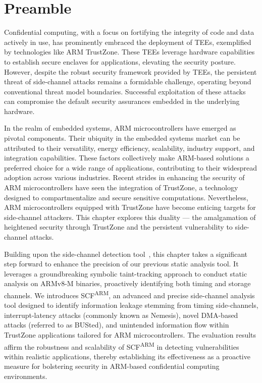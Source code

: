 
\section*{Preamble}

Confidential computing, with a focus on fortifying the integrity of code
and data actively in use, has prominently embraced the deployment of
\acp{TEE}, exemplified by technologies like ARM TrustZone. These
\acp{TEE} leverage hardware capabilities to establish secure enclaves for
applications, elevating the security posture. However, despite the robust
security framework provided by \acp{TEE}, the persistent threat of
side-channel attacks remains a formidable challenge, operating beyond
conventional threat model boundaries. Successful exploitation of these
attacks can compromise the default security assurances embedded in the
underlying hardware.

In the realm of embedded systems, ARM microcontrollers have emerged as
pivotal components. Their ubiquity in the embedded systems market can be
attributed to their versatility, energy efficiency, scalability, industry
support, and integration capabilities. These factors collectively make
ARM-based solutions a preferred choice for a wide range of applications,
contributing to their widespread adoption across various industries. Recent
strides in enhancing the security of ARM microcontrollers have seen the
integration of TrustZone, a technology designed to compartmentalize and
secure sensitive computations. Nevertheless, ARM microcontrollers equipped
with TrustZone have become enticing targets for side-channel attackers.
This chapter explores this duality — the amalgamation of heightened
security through TrustZone and the persistent vulnerability to side-channel
attacks.

Building upon the side-channel detection tool~\cite{scfmsp}, this chapter takes a significant step forward to enhance
the precision of our previous static analysis tool. It leverages a
groundbreaking symbolic taint-tracking approach to conduct static analysis
on ARMv8-M binaries, proactively identifying both timing and storage
channels. We introduces \ac{SCF}\textsuperscript{ARM}, an advanced and
precise side-channel analysis tool designed to identify information leakage
stemming from timing side-channels, interrupt-latency attacks (commonly
known as Nemesis), novel DMA-based attacks (referred to as BUSted), and
unintended information flow within TrustZone applications tailored for ARM
microcontrollers.  The evaluation results affirm the robustness and
scalability of \ac{SCF}\textsuperscript{ARM} in detecting vulnerabilities
within realistic applications, thereby establishing its effectiveness as a
proactive measure for bolstering security in ARM-based confidential
computing environments.

